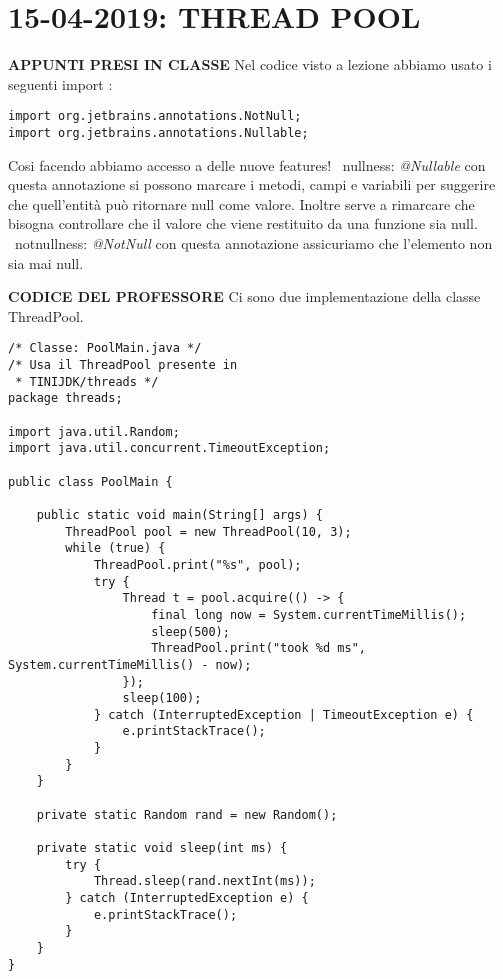

\newpage
\section{15-04-2019: THREAD POOL}
\noindent \textbf{APPUNTI PRESI IN CLASSE} \newline
Nel codice visto a lezione abbiamo usato i seguenti import :
\begin{lstlisting}
import org.jetbrains.annotations.NotNull;
import org.jetbrains.annotations.Nullable;
\end{lstlisting}
Cosi facendo abbiamo accesso a delle nuove features! \newline
\textbullet\ nullness: \textit{@Nullable} con questa annotazione si possono marcare i metodi, campi e variabili per suggerire che quell'entità può ritornare null come valore. Inoltre serve a rimarcare che bisogna controllare che il valore che viene restituito da una funzione sia null. \newline
\textbullet\ notnullness: \textit{@NotNull} con questa annotazione assicuriamo che l'elemento non sia mai null. \newline

\noindent \textbf{CODICE DEL PROFESSORE} \newline
\noindent Ci sono due implementazione della classe ThreadPool. \newline

\begin{lstlisting}
/* Classe: PoolMain.java */
/* Usa il ThreadPool presente in
 * TINIJDK/threads */
package threads;

import java.util.Random;
import java.util.concurrent.TimeoutException;

public class PoolMain {

    public static void main(String[] args) {
        ThreadPool pool = new ThreadPool(10, 3);
        while (true) {
            ThreadPool.print("%s", pool);
            try {
                Thread t = pool.acquire(() -> {
                    final long now = System.currentTimeMillis();
                    sleep(500);
                    ThreadPool.print("took %d ms", System.currentTimeMillis() - now);
                });
                sleep(100);
            } catch (InterruptedException | TimeoutException e) {
                e.printStackTrace();
            }
        }
    }

    private static Random rand = new Random();

    private static void sleep(int ms) {
        try {
            Thread.sleep(rand.nextInt(ms));
        } catch (InterruptedException e) {
            e.printStackTrace();
        }
    }
}
\end{lstlisting}




